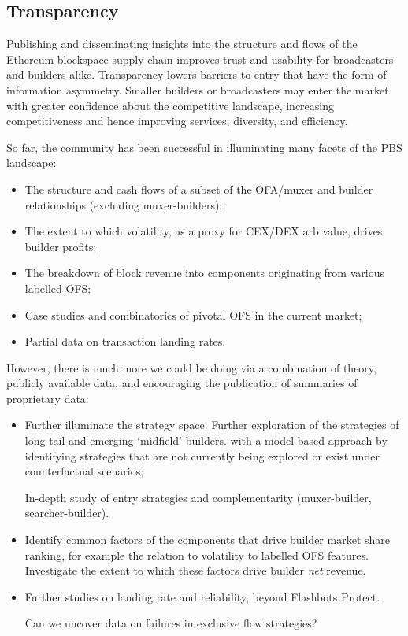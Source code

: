 \subsection*{Transparency}

Publishing and disseminating insights into the structure and flows of the Ethereum blockspace supply chain improves trust and usability for broadcasters and builders alike.
%
Transparency lowers barriers to entry that have the form of information asymmetry. 
%
Smaller builders or broadcasters may enter the market with greater confidence about the competitive landscape, increasing competitiveness and hence improving services, diversity, and efficiency.

So far, the community has been successful in illuminating many facets of the PBS landscape:
%
\begin{itemize}
  \item The structure and cash flows of a subset of the OFA/muxer and builder relationships (excluding muxer-builders);
  \item The extent to which volatility, as a proxy for CEX/DEX arb value, drives builder profits;
  \item The breakdown of block revenue into components originating from various labelled OFS;
  \item Case studies and combinatorics of pivotal OFS in the current market;
  \item Partial data on transaction landing rates.
\end{itemize}
%
However, there is much more we could be doing via a combination of theory, publicly available data, and encouraging the publication of summaries of proprietary data:
%
\begin{itemize}
    \item 
      Further illuminate the strategy space.
      Further exploration of the strategies of long tail and emerging `midfield' builders.
       with a model-based approach by identifying strategies that are not currently being explored or exist under counterfactual scenarios;

      In-depth study of entry strategies and complementarity (muxer-builder, searcher-builder). 
    \item 
      Identify common factors of the components that drive builder market share ranking, for example the relation to volatility to labelled OFS features.
      Investigate the extent to which these factors drive builder \emph{net} revenue.
    \item 
      Further studies on landing rate and reliability, beyond Flashbots Protect.

      Can we uncover data on failures in exclusive flow strategies?
\end{itemize}

